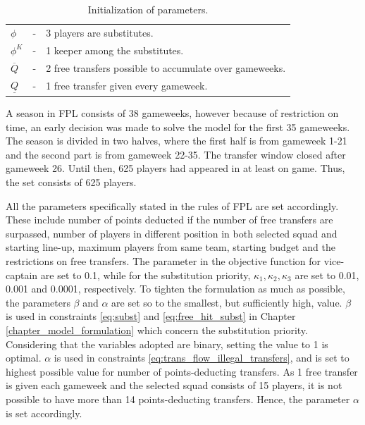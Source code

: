 \begin{table}[H]
\begin{tabular}{@{}lll@{}}
$\phi$                           & - & 3 players are substitutes.                                                         \\
$\phi^{K}$                       & - & 1 keeper among the substitutes.                                                          \\
$\overline{Q}$                   & - & 2 free transfers possible to accumulate over gameweeks.                                              \\
$\underline{Q}$                  & - & 1 free transfer given every gameweek.                                      \\ \bottomrule
\end{tabular}
\caption{Initialization of parameters.}
\label{tab:initialization_of_parameters}
\end{table}

 
A season in FPL consists of 38 gameweeks, however because of restriction on time, an early decision was made to solve the model for the first 35 gameweeks. The season is divided in two halves, where the first half is from gameweek 1-21 and the second part is from gameweek 22-35. The transfer window closed after gameweek 26. Until then, 625 players had appeared in at least on game. Thus, the set consists of 625 players.

\newpar

All the parameters specifically stated in the rules of FPL are set accordingly. These include number of points deducted if the number of free transfers are surpassed, number of players in different position in both selected squad and starting line-up, maximum players from same team, starting budget and the restrictions on free transfers. The parameter in the objective function for vice-captain are set to 0.1, while for the substitution priority, $\kappa_{1}, \kappa_{2}, \kappa_{3}$ are set to 0.01, 0.001 and 0.0001, respectively. To tighten the formulation as much as possible, the parameters $\beta$ and $\alpha$ are set so to the smallest, but sufficiently high, value. $\beta$ is used in constraints \eqref{eq:subst} and \eqref{eq:free_hit_subst} in Chapter \ref{chapter_model_formulation} which concern the substitution priority. Considering that the variables adopted are binary, setting the value to 1 is optimal. $\alpha$ is used in constraints \eqref{eq:trans_flow_illegal_transfers}, and is set to highest possible value for number of points-deducting transfers. As 1 free transfer is given each gameweek and the selected squad consists of 15 players, it is not possible to have more than 14 points-deducting transfers. Hence, the parameter $\alpha$ is set accordingly. 




